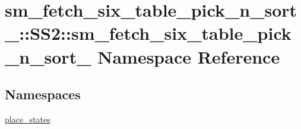 \hypertarget{namespacesm__fetch__six__table__pick__n__sort__1_1_1SS2_1_1sm__fetch__six__table__pick__n__sort__1}{}\section{sm\+\_\+fetch\+\_\+six\+\_\+table\+\_\+pick\+\_\+n\+\_\+sort\+\_\+:\+:S\+S2\+:\+:sm\+\_\+fetch\+\_\+six\+\_\+table\+\_\+pick\+\_\+n\+\_\+sort\+\_ Namespace Reference}
\label{namespacesm__fetch__six__table__pick__n__sort__1_1_1SS2_1_1sm__fetch__six__table__pick__n__sort__1}
\subsection*{Namespaces}
\begin{DoxyCompactItemize}
\item 
 \hyperlink{namespacesm__fetch__six__table__pick__n__sort__1_1_1SS2_1_1sm__fetch__six__table__pick__n__sort__1_1_1place__states}{place\+\_\+states}
\end{DoxyCompactItemize}
